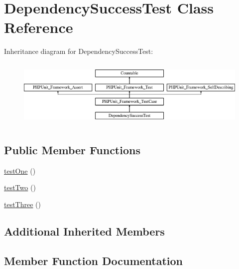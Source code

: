 \hypertarget{class_dependency_success_test}{}\section{Dependency\+Success\+Test Class Reference}
\label{class_dependency_success_test}
Inheritance diagram for Dependency\+Success\+Test\+:\begin{figure}[H]
\begin{center}
\leavevmode
\includegraphics[height=3.303835cm]{class_dependency_success_test}
\end{center}
\end{figure}
\subsection*{Public Member Functions}
\begin{DoxyCompactItemize}
\item 
\mbox{\hyperlink{class_dependency_success_test_afbf3ff88b322c6a7197ce02297cd23a0}{test\+One}} ()
\item 
\mbox{\hyperlink{class_dependency_success_test_a4fb9974ce113d5d1db8075e0db0dc9b6}{test\+Two}} ()
\item 
\mbox{\hyperlink{class_dependency_success_test_a0bd6c752e665cd0e690512ca38d15d41}{test\+Three}} ()
\end{DoxyCompactItemize}
\subsection*{Additional Inherited Members}


\subsection{Member Function Documentation}
\mbox{\label{class_dependency_success_test_afbf3ff88b322c6a7197ce02297cd23a0}} 
